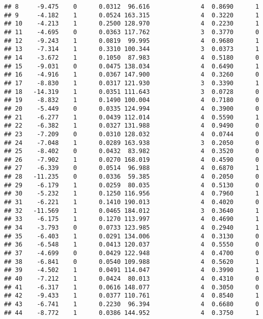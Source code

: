 \documentclass[
]{article}
\begin{document}
\begin{verbatim}
## 8     -9.475    0      0.0312  96.616              4  0.8690      1
## 9     -4.182    1      0.0524 163.315              4  0.3220      1
## 10    -4.213    1      0.2500 128.970              4  0.2230      1
## 11    -4.695    0      0.0363 117.762              3  0.3770      0
## 12    -9.243    1      0.0819  99.995              4  0.9680      1
## 13    -7.314    1      0.3310 100.344              3  0.0373      1
## 14    -3.672    1      0.1050  87.983              4  0.5180      0
## 15    -9.031    0      0.0475 138.034              4  0.6490      1
## 16    -4.916    1      0.0367 147.900              4  0.3260      0
## 17    -8.830    1      0.0317 121.930              3  0.3390      1
## 18   -14.319    1      0.0351 111.643              3  0.0728      0
## 19    -8.832    1      0.1490 100.004              4  0.7180      0
## 20    -5.449    0      0.0335 124.994              4  0.3900      0
## 21    -6.277    1      0.0439 112.014              4  0.5590      1
## 22    -6.382    1      0.0327 131.988              4  0.9490      0
## 23    -7.209    0      0.0310 128.032              4  0.0744      0
## 24    -7.048    1      0.0289 163.938              3  0.2050      0
## 25    -8.402    0      0.0432  83.982              4  0.3520      0
## 26    -7.902    1      0.0270 168.019              4  0.4590      0
## 27    -6.339    0      0.0514  96.988              4  0.6870      1
## 28   -11.235    0      0.0336  59.385              4  0.2050      0
## 29    -6.179    1      0.0259  80.035              4  0.5130      0
## 30    -5.232    1      0.1250 116.956              4  0.7960      1
## 31    -6.221    1      0.1410 190.013              4  0.4020      0
## 32   -11.569    1      0.0465 184.012              3  0.3640      1
## 33    -6.175    1      0.1270 113.997              4  0.4690      1
## 34    -3.793    0      0.0733 123.985              4  0.2940      1
## 35    -6.403    1      0.0291 134.006              4  0.3130      0
## 36    -6.548    1      0.0413 120.037              4  0.5550      0
## 37    -4.699    0      0.0429 122.948              4  0.4700      0
## 38    -6.841    0      0.0540 109.988              4  0.5620      1
## 39    -4.502    1      0.0491 114.047              4  0.3990      1
## 40    -7.212    1      0.0424  80.013              4  0.4310      0
## 41    -6.317    1      0.0616 148.077              4  0.3050      0
## 42    -9.433    1      0.0377 110.761              4  0.8540      1
## 43    -6.741    1      0.2230  96.394              4  0.6680      0
## 44    -8.772    1      0.0386 144.952              4  0.3750      1

\end{verbatim}
\end{document}
